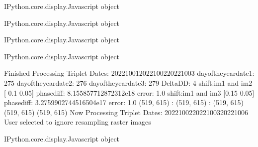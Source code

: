 \documentclass[letterpaper,10pt]{sphinxmanual}
\begin{document}
\begin{sphinxVerbatim}[commandchars=\\\{\}]
\PYGZlt{}IPython.core.display.Javascript object\PYGZgt{}
\end{sphinxVerbatim}



\begin{sphinxVerbatim}[commandchars=\\\{\}]
\PYGZlt{}IPython.core.display.Javascript object\PYGZgt{}
\end{sphinxVerbatim}



\begin{sphinxVerbatim}[commandchars=\\\{\}]
\PYGZlt{}IPython.core.display.Javascript object\PYGZgt{}
\end{sphinxVerbatim}



\begin{sphinxVerbatim}[commandchars=\\\{\}]
\PYGZlt{}IPython.core.display.Javascript object\PYGZgt{}
\end{sphinxVerbatim}



\begin{sphinxVerbatim}[commandchars=\\\{\}]
Finished Processing Triplet Dates:  20221001\PYGZhy{}20221002\PYGZhy{}20221003
day\PYGZus{}of\PYGZus{}the\PYGZus{}year\PYGZus{}date1:  275
\PYGZhy{}\PYGZhy{}\PYGZhy{}\PYGZhy{}\PYGZhy{}\PYGZhy{}\PYGZhy{}\PYGZhy{}\PYGZhy{}\PYGZhy{}\PYGZhy{}\PYGZhy{}\PYGZhy{}\PYGZhy{}\PYGZhy{}\PYGZhy{}\PYGZhy{}\PYGZhy{}\PYGZhy{}\PYGZhy{}\PYGZhy{}
day\PYGZus{}of\PYGZus{}the\PYGZus{}year\PYGZus{}date2:  276
\PYGZhy{}\PYGZhy{}\PYGZhy{}\PYGZhy{}\PYGZhy{}\PYGZhy{}\PYGZhy{}\PYGZhy{}\PYGZhy{}\PYGZhy{}\PYGZhy{}\PYGZhy{}\PYGZhy{}\PYGZhy{}\PYGZhy{}\PYGZhy{}\PYGZhy{}\PYGZhy{}\PYGZhy{}\PYGZhy{}\PYGZhy{}
day\PYGZus{}of\PYGZus{}the\PYGZus{}year\PYGZus{}date3:  279
\PYGZhy{}\PYGZhy{}\PYGZhy{}\PYGZhy{}\PYGZhy{}\PYGZhy{}\PYGZhy{}\PYGZhy{}\PYGZhy{}\PYGZhy{}\PYGZhy{}\PYGZhy{}\PYGZhy{}\PYGZhy{}\PYGZhy{}\PYGZhy{}\PYGZhy{}\PYGZhy{}\PYGZhy{}\PYGZhy{}\PYGZhy{}
Delta\PYGZus{}DD: 4
shift:im1 and im2 [ 0.1  \PYGZhy{}0.05] phasediff: 8.155857712872312e\PYGZhy{}18 error: 1.0
shift:im1 and im3 [0.15 0.05] phasediff: 3.2759902744516504e\PYGZhy{}17 error: 1.0
(519, 615) :  (519, 615) :  (519, 615)
(519, 615)
(519, 615)
Now Processing Triplet Dates:  20221002\PYGZhy{}20221003\PYGZhy{}20221006
 User selected to ignore resampling raster images 



\PYGZlt{}IPython.core.display.Javascript object\PYGZgt{}
\end{sphinxVerbatim}
\end{document}
